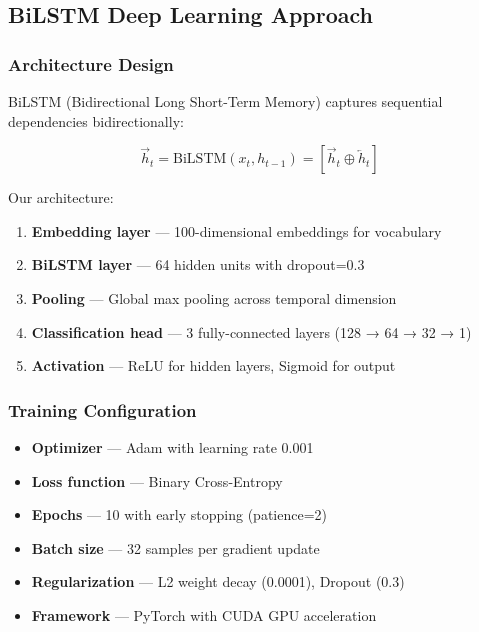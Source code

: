 \subsection{BiLSTM Deep Learning Approach}

\subsubsection{Architecture Design}

BiLSTM (Bidirectional Long Short-Term Memory) captures sequential dependencies bidirectionally:

\begin{equation}
\vec{h}_t = \text{BiLSTM}(x_t, h_{t-1}) = [\overrightarrow{h}_t \oplus \overleftarrow{h}_t]
\end{equation}

Our architecture:
\begin{enumerate}
  \item \textbf{Embedding layer} --- 100-dimensional embeddings for vocabulary
  \item \textbf{BiLSTM layer} --- 64 hidden units with dropout=0.3
  \item \textbf{Pooling} --- Global max pooling across temporal dimension
  \item \textbf{Classification head} --- 3 fully-connected layers (128 → 64 → 32 → 1)
  \item \textbf{Activation} --- ReLU for hidden layers, Sigmoid for output
\end{enumerate}

\subsubsection{Training Configuration}

\begin{itemize}
  \item \textbf{Optimizer} --- Adam with learning rate 0.001
  \item \textbf{Loss function} --- Binary Cross-Entropy
  \item \textbf{Epochs} --- 10 with early stopping (patience=2)
  \item \textbf{Batch size} --- 32 samples per gradient update
  \item \textbf{Regularization} --- L2 weight decay (0.0001), Dropout (0.3)
  \item \textbf{Framework} --- PyTorch with CUDA GPU acceleration
\end{itemize}

